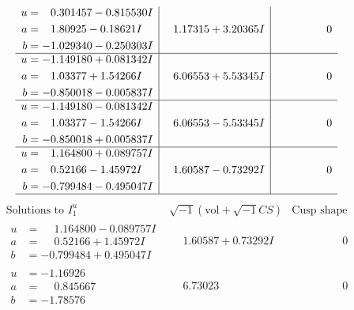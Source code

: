 \documentclass[1p]{elsarticle_modified}
\theoremstyle{definition}
\newcommand{\I}{\sqrt{-1}}
\begin{document}
$$\begin{array}{c|c|c}
\begin{aligned}
u &= \phantom{-}0.301457 - 0.815530 I \\
a &= \phantom{-}1.80925 - 0.18621 I \\
b &= -1.029340 - 0.250303 I\end{aligned}
 & \phantom{-}1.17315 + 3.20365 I & \phantom{-0.000000 } 0 \\ \hline\begin{aligned}
u &= -1.149180 + 0.081342 I \\
a &= \phantom{-}1.03377 + 1.54266 I \\
b &= -0.850018 - 0.005837 I\end{aligned}
 & \phantom{-}6.06553 + 5.53345 I & \phantom{-0.000000 } 0 \\ \hline\begin{aligned}
u &= -1.149180 - 0.081342 I \\
a &= \phantom{-}1.03377 - 1.54266 I \\
b &= -0.850018 + 0.005837 I\end{aligned}
 & \phantom{-}6.06553 - 5.53345 I & \phantom{-0.000000 } 0 \\ \hline\begin{aligned}
u &= \phantom{-}1.164800 + 0.089757 I \\
a &= \phantom{-}0.52166 - 1.45972 I \\
b &= -0.799484 - 0.495047 I\end{aligned}
 & \phantom{-}1.60587 - 0.73292 I & \phantom{-0.000000 } 0\\
 \hline 
 \end{array}$$\newpage$$\begin{array}{c|c|c}  
\text{Solutions to }I^u_{1}& \I (\text{vol} + \sqrt{-1}CS) & \text{Cusp shape}\\
 \hline 
\begin{aligned}
u &= \phantom{-}1.164800 - 0.089757 I \\
a &= \phantom{-}0.52166 + 1.45972 I \\
b &= -0.799484 + 0.495047 I\end{aligned}
 & \phantom{-}1.60587 + 0.73292 I & \phantom{-0.000000 } 0 \\ \hline\begin{aligned}
u &= -1.16926\phantom{ +0.000000I} \\
a &= \phantom{-}0.845667\phantom{ +0.000000I} \\
b &= -1.78576\phantom{ +0.000000I}\end{aligned}
 & \phantom{-}6.73023\phantom{ +0.000000I} & \phantom{-0.000000 } 0 \\ \hline\begin{aligned}

\end{aligned}
\end{array}$$
\end{document}
